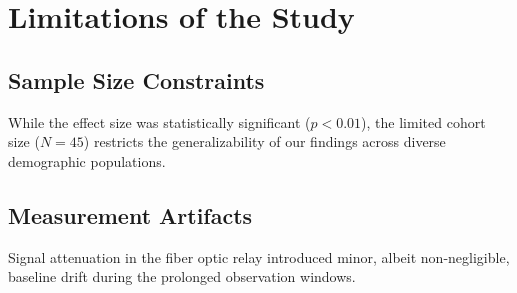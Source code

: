 \documentclass{article}
\begin{document}
\section{Limitations of the Study}
\subsection{Sample Size Constraints}
While the effect size was statistically significant ($p < 0.01$), the limited cohort size ($N=45$) restricts the generalizability of our findings across diverse demographic populations.
\subsection{Measurement Artifacts}
Signal attenuation in the fiber optic relay introduced minor, albeit non-negligible, baseline drift during the prolonged observation windows.
\end{document}
